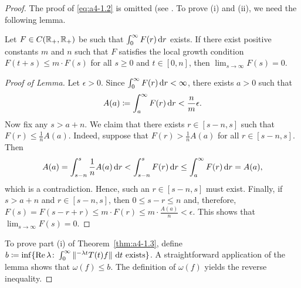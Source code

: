 \begin{proof}  The proof of \eqref{eq:a4-1.2} is omitted (see \citet[p.306]{hillephillips:1957}. 
To prove (i) and (ii), we need the following lemma.
\begin{lemma*}\label{lem:a4-1.3}
Let $F \in C(\mathbb{R}_{+},\mathbb{R}_{+})$ be such that $\int_{0}^{\infty} F(r) \mathop{}\!\mathrm{d}{r}$ exists. 
If there exist positive constants $m$ and $n$ such that $F$ satisfies the local growth condition $F(t + s) \leq m \cdot F(s)$ for all $s \geq 0$ and $t \in \left[0,n\right]$, then $\lim_{s \to \infty} F(s) = 0$.
\end{lemma*}
\begin{proof}[Proof of Lemma]
Let $\epsilon > 0$. Since $\int_0^\infty F(r) \mathop{}\!\mathrm{d}{r} < \infty$, there exists $a > 0$ such that
\[
A(a) \coloneqq \int_{a}^{\infty} F(r) \mathop{}\!\mathrm{d}{r} < \frac{n}{m}\epsilon.
\]
Now fix any $s > a + n$. We claim that there exists $r \in [s - n, s]$ such that
\(
F(r) \leq \frac{1}{n}A(a).
\)
Indeed, suppose that $F(r) > \frac{1}{n}A(a)$ for all $r \in [s - n, s]$. Then
\[ A(a) = \int_{s-n}^{s}\frac{1}{n}A(a)\mathop{}\!\mathrm{d}{r} < \int_{s-n}^{s}F(r)\mathop{}\!\mathrm{d}{r} \le \int_a^\infty F(r)\mathop{}\!\mathrm{d}{r} = A(a), \]
which is a contradiction.
Hence, such an $r \in [s - n, s]$ must exist.
Finally, if $s>a+n$ and $r\in [s-n,s]$, then $0\le s-r\le n$ and, therefore, $F(s) = F(s-r+r) \leq m \cdot F(r) \leq m \cdot \frac{A(a)}{n} < \epsilon$. 
This shows that $\lim_{s \to \infty} F(s) = 0$.
\end{proof}
To prove part (i) of Theorem~\ref{thm:a4-1.3}, define $b \coloneqq \inf\{\mathop{}\!\mathrm{Re}\,\lambda\colon\int_{0}^{\infty} \|^{-\lambda t} T(t)f\| \,\mathop{}\!\mathrm{d}{t} \text{ exists}\}$. 
A straightforward application of the lemma shows that $\omega(f) \leq b$.
The definition of $\omega(f)$ yields the reverse inequality.


\end{proof}
